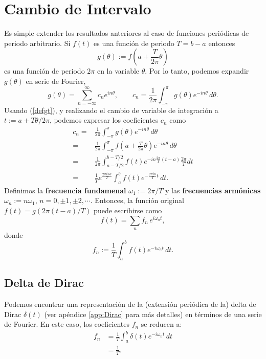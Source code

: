 \section{Cambio de Intervalo}
Es simple extender los resultados anteriores al caso de funciones periódicas de periodo arbitrario. Si $f(t)$ es una función de periodo $T=b-a$ entonces
\begin{equation}\label{defgt}
g(\theta):=f(a+\frac{T}{2\pi}\theta)
\end{equation}
es una función de periodo $2\pi$ en la variable $\theta$. Por lo tanto, podemos expandir $g(\theta)$ en serie de Fourier,
\begin{equation}\label{sfgt}
g(\theta)=\sum_{n=-\infty}^\infty c_n e^{i n\theta}, \qquad c_n =\frac{1}{2\pi}\int_{-\pi}^\pi g(\theta) e^{-in\theta}\,d\theta .
\end{equation}
Usando (\ref{defgt}), y realizando el cambio de variable de integración a $t:=a+T\theta/2\pi$,  podemos expresar los coeficientes $c_n$ como
\begin{align}
c_n =& \frac{1}{2\pi}\int_{-\pi}^\pi g(\theta) e^{-in\theta}\,d\theta  \\
=& \frac{1}{2\pi}\int_{-\pi}^\pi f(a+\frac{T}{2\pi}\theta) e^{-in\theta}\,d\theta \\
=& \frac{1}{2\pi}\int_{a-T/2}^{b-T/2} f(t) e^{-in\frac{2\pi}{T}(t-a)}\frac{2\pi}{T}dt \\
=& \frac{1}{T}e^{\frac{2\pi ina}{T}}\int_a^b f(t) e^{-\frac{2\pi i n}{T}t}\,dt.
\end{align}
Definimos la \textbf{frecuencia fundamenal} $\omega_1:=2\pi/T$ y las \textbf{frecuencias armónicas} $\omega_n:=n\omega_1$, $n=0,\pm 1, \pm 2, \cdots$. Entonces, la función original $f(t)=g(2\pi(t-a)/T)$ puede escribirse como
\begin{equation}\label{ftpT}
\boxed{f(t)=\sum_n f_n\, e^{i\omega_n t},}
\end{equation}
donde
\begin{equation}\label{fnpT}
\boxed{f_n:=\frac{1}{T}\int_a^b f(t) e^{-i\omega_n t}\,dt.}
\end{equation}

\subsection{Delta de Dirac}
Podemos encontrar una representación de la (extensión periódica de la) delta de Dirac $\delta(t)$ (ver apéndice \ref{app:Dirac} para más detalles) en términos de una serie de Fourier. En este caso, los coeficientes $f_n$ se reducen a:
\begin{align}
f_n &= \frac{1}{T}\int_a^b \delta(t) e^{-i\omega_n t}\,dt \\
&= \frac{1}{T}.
\end{align}

